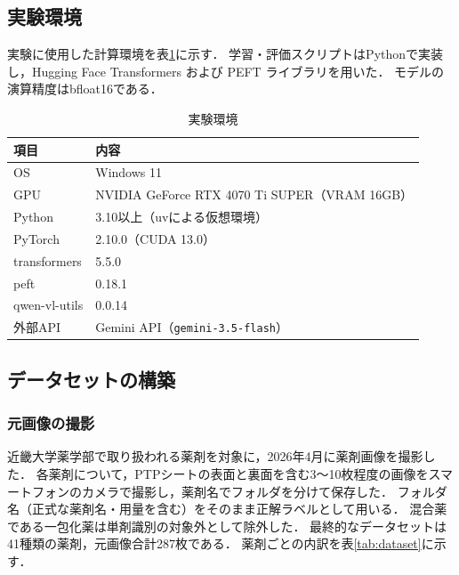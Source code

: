 \documentclass[dvipdfmx]{jsarticle}
\begin{document}
\subsection{実験環境}

実験に使用した計算環境を表\ref{tab:env}に示す．
学習・評価スクリプトはPythonで実装し，Hugging Face Transformers および PEFT ライブラリを用いた．
モデルの演算精度はbfloat16である．

\begin{table}[htbp]
\centering
\caption{実験環境}
\label{tab:env}
\begin{tabular}{ll}
\hline
項目 & 内容 \\
\hline
OS & Windows 11 \\
GPU & NVIDIA GeForce RTX 4070 Ti SUPER（VRAM 16GB） \\
Python & 3.10以上（uvによる仮想環境） \\
PyTorch & 2.10.0（CUDA 13.0） \\
transformers & 5.5.0 \\
peft & 0.18.1 \\
qwen-vl-utils & 0.0.14 \\
外部API & Gemini API（\texttt{gemini-3.5-flash}） \\
\hline
\end{tabular}
\end{table}

\subsection{データセットの構築}\label{sec:dataset}

\subsubsection{元画像の撮影}

近畿大学薬学部で取り扱われる薬剤を対象に，2026年4月に薬剤画像を撮影した．
各薬剤について，PTPシートの表面と裏面を含む3〜10枚程度の画像をスマートフォンのカメラで撮影し，薬剤名でフォルダを分けて保存した．
フォルダ名（正式な薬剤名・用量を含む）をそのまま正解ラベルとして用いる．
混合薬である一包化薬は単剤識別の対象外として除外した．
最終的なデータセットは41種類の薬剤，元画像合計287枚である．
薬剤ごとの内訳を表\ref{tab:dataset}に示す．
\end{document}

